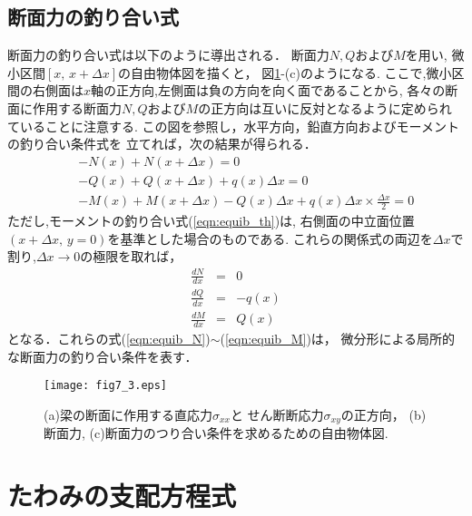 \documentclass[10pt,a4j]{jbook}
\begin{document}
\subsection{断面力の釣り合い式}
断面力の釣り合い式は以下のように導出される．
断面力$N,Q$および$M$を用い, 微小区間$[x,\,x+\Delta x]$の自由物体図を描くと，
図\ref{fig:fig7_3}-(c)のようになる.
ここで,微小区間の右側面は$x$軸の正方向,左側面は負の方向を向く面であることから,
各々の断面に作用する断面力$N,Q$および$M$の正方向は互いに反対となるように定められ
ていることに注意する.
この図を参照し，水平方向，鉛直方向およびモーメントの釣り合い条件式を
立てれば，次の結果が得られる．
\begin{eqnarray}
	&&-N(x)+N(x+\Delta x) =0 \label{eqn:equib_x} \\
	&&-Q(x)+Q(x+\Delta x)+q(x)\Delta x =0 \label{eqn:equib_y} \\
	&&-M(x)+M(x+\Delta x)-Q(x)\Delta x +q(x)\Delta x \times \frac{\Delta x}{2}=0 \label{eqn:equib_th}
\end{eqnarray}
ただし,モーメントの釣り合い式(\ref{eqn:equib_th})は,
右側面の中立面位置$(x+\Delta x,\, y=0)$を基準とした場合のものである.
これらの関係式の両辺を$\Delta x$で割り,$\Delta x \rightarrow 0$の極限を取れば，
\begin{eqnarray}
	\frac{dN}{dx}&=&0  \label{eqn:equib_N} \\
	\frac{dQ}{dx}&=&-q(x) \label{eqn:equib_Q} \\
	\frac{dM}{dx}&=&Q(x) \label{eqn:equib_M}
\end{eqnarray}
となる．これらの式(\ref{eqn:equib_N})$\sim$(\ref{eqn:equib_M})は，
微分形による局所的な断面力の釣り合い条件を表す．
\begin{figure}
	\begin{center}
	\texttt{[image: fig7\_3.eps]} 
	\end{center}
	\caption{
	(a)梁の断面に作用する直応力$\sigma_{xx}$と
	せん断断応力$\sigma_{xy}$の正方向，
	(b)断面力, 
	(c)断面力のつり合い条件を求めるための自由物体図. 
	 } 
	\label{fig:fig7_3}
\end{figure}
\section{たわみの支配方程式}
\end{document}
